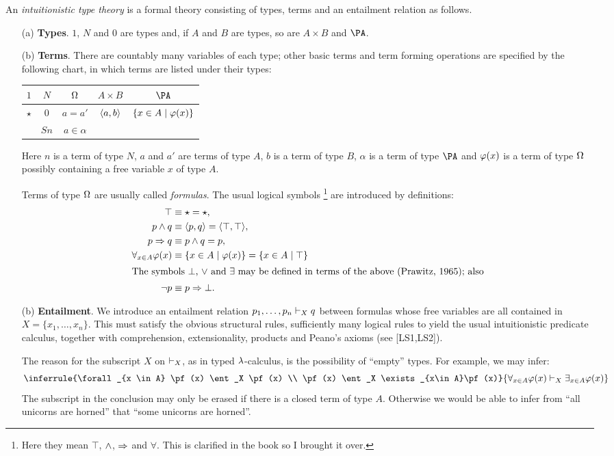 \begin{defn}
An {\em intuitionistic type theory} is a formal theory consisting of
types, terms and an entailment relation as follows.
\begin{enumerate}
\item[(a)] {\bf Types}. $1$, $N$ and $0$ are types and, if $A$ and $B$ are types, so
are $A \times B$ and $\PA$.
\item[(b)] {\bf Terms}. There are countably many variables of each type; other basic
terms and term forming operations are specified by the following chart, in
which terms are listed under their types:
\begin{center}
\begin{tabular}{ c c c c c }
$1$ & $N$ & $\Omega$ & $A \times B$ & $\PA$\\
\hline
$\star$ & $0$ & $a = a'$ & $\langle a,b \rangle$& $\{x \in A \mid \varphi (x)\}$\\
&$S n$&$a \in \alpha$\\
\end{tabular}
\end{center}
\medskip
Here $n$ is a term of type $N$, $a$ and $a'$ are terms of type $A$, $b$ is a term
of type $B$, $\alpha$ is a term of type $\PA$ and $\varphi(x)$ is a term of type $\Omega$
possibly containing a free variable $x$ of type $A$.

Terms of type $\Omega$ are usually called {\em formulas}. The usual logical symbols%
\footnote{Here they mean $\top$, $\wedge$, $\Rightarrow$ and $\forall$. This is clarified in the book
so I brought it over.}
are introduced by definitions:
\begin{align*}
\top &\equiv \star = \star,\\
p \sland q &\equiv \la p,q \ra = \la \top, \top\ra,\\
p \impl q &\equiv p \sland q = p,\\
\forall_{x \in A} \pf(x) &\equiv \{ x \in A \mid \pf(x)\} = \{x \in A \mid \top\}\\
\intertext{The symbols $\bot$, $\vee$ and $\exists$ may be defined in terms of the above (Prawitz,
1965); also}%
\neg p &\equiv p \impl \bot .
\end{align*}
\item[(b)] {\bf Entailment}. We introduce an entailment relation $p_1, \dots, p_n \vdash_X q$
between formulas whose free variables are all contained in $X = \{x_1, \dots, x_n\}$.
This must satisfy the obvious structural rules, sufficiently many logical
rules to yield the usual intuitionistic predicate calculus, together with
comprehension, extensionality, products and Peano's axioms (see [LS1,LS2]).

The reason for the subscript $X$ on $\vdash_X$, as in typed $\lambda$-calculus, is the
possibility of ``empty'' types. For example, we may infer:
\[
\inferrule
	{\forall_{x \in A} \pf(x) \ent_X \pf(x) \\ \pf(x) \ent_X \exists_{x\in A}\pf(x)}
	{\forall_{x \in A} \pf(x)  \ent_X \exists_{x\in A}\pf(x)}
\]
The subscript in the conclusion may only be erased if there is a closed term
of type $A$. Otherwise we would be able to infer from ``all unicorns are horned''
that ``some unicorns are horned''.
\end{enumerate}
\end{defn}
